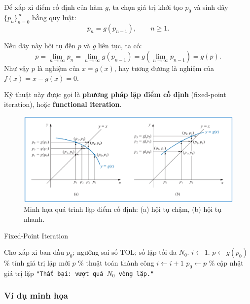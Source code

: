 Để xấp xỉ điểm cố định của hàm $g$, ta chọn giá trị khởi tạo $p_0$ và sinh dãy
$\{p_n\}_{n=0}^{\infty}$ bằng quy luật:
\[
p_n = g(p_{n-1}), \qquad n \ge 1.
\]

Nếu dãy này hội tụ đến $p$ và $g$ liên tục, ta có:
\[
p = \lim_{n\to\infty} p_n = \lim_{n\to\infty} g(p_{n-1})
  = g\!\left(\lim_{n\to\infty} p_{n-1}\right) = g(p).
\]
Như vậy $p$ là nghiệm của $x = g(x)$, hay tương đương là nghiệm của $f(x) = x - g(x) = 0$.

Kỹ thuật này được gọi là \textbf{phương pháp lặp điểm cố định} (fixed-point iteration),
hoặc \textbf{functional iteration}.

\begin{figure}[!h]
\centering
\includegraphics[width=0.8\linewidth]{figures/fixed_point_iteration_placeholder.png}
\caption{Minh họa quá trình lặp điểm cố định: (a) hội tụ chậm, (b) hội tụ nhanh.}
\label{fig:fixed_point_iteration}
\end{figure}

\begin{algorithm}[!h]
\caption{Fixed-Point Iteration}
\label{alg:fixed_point_iteration}
\begin{algorithmic}[1]
\STATE Cho xấp xỉ ban đầu $p_0$; ngưỡng sai số $\text{TOL}$; số lặp tối đa $N_0$.
\STATE $i \gets 1$.
    \STATE $p \gets g(p_0)$ \hfill \% tính giá trị lặp mới
        \RETURN $p$ \hfill \% thuật toán thành công
    \ENDIF
    \STATE $i \gets i + 1$
    \STATE $p_0 \gets p$ \hfill \% cập nhật giá trị lặp
\ENDWHILE
\RETURN \texttt{"Thất bại: vượt quá $N_0$ vòng lặp."}
\end{algorithmic}
\end{algorithm}

\subsubsection*{Ví dụ minh họa}

